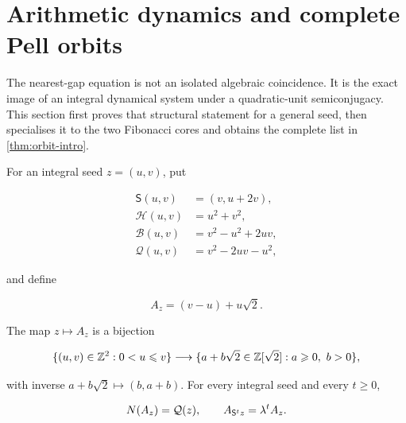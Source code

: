 %
%
\section{Arithmetic dynamics and complete Pell orbits}
\label{sec:zero-defect}

The nearest-gap equation is not an isolated algebraic coincidence. It is the
exact image of an integral dynamical system under a quadratic-unit
semiconjugacy. This section first proves that structural statement for a
general seed, then specialises it to the two Fibonacci cores and obtains the
complete list in \cref{thm:orbit-intro}.

For an integral seed $z=(u,v)$, put

\begin{equation}
\begin{aligned}
 \mathsf S(u,v)&=(v,u+2v),\\
 \mathcal H(u,v)&=u^2+v^2,\\
 \mathcal B(u,v)&=v^2-u^2+2uv,\\
 \mathcal Q(u,v)&=v^2-2uv-u^2,
\end{aligned}
\label{eq:orbit-forms}
\end{equation}

and define

\begin{equation}
 A_z=(v-u)+u\sqrt2.
 \label{eq:seed-unit-map}
\end{equation}

\begin{proposition}
\label{prop:seed-semiconjugacy}
The map $z\mapsto A_z$ is a bijection

\begin{equation}
 \{(u,v)\in\mathbb{Z}^2:0<u\leqslant v\}
 \longrightarrow
 \{a+b\sqrt2\in\mathbb{Z}[\sqrt2]:a\geqslant0,\ b>0\},
 \label{eq:cone-bijection}
\end{equation}

with inverse $a+b\sqrt2\mapsto(b,a+b)$. For every integral seed and every
$t\geqslant0$,

\begin{equation}
 N\!\left(A_z\right)=\mathcal Q(z),
 \qquad
 A_{\mathsf S^tz}=\lambda^tA_z.
 \label{eq:semiconjugacy}
\end{equation}
\end{proposition}

